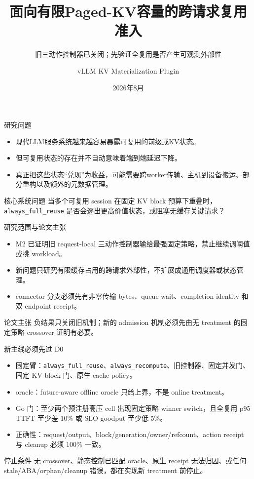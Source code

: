 \documentclass[aspectratio=169,UTF8,11pt]{ctexbeamer}
\title[有限缓存复用准入]{面向有限Paged-KV容量的跨请求复用准入}
\subtitle{旧三动作控制器已关闭；先验证全复用是否产生可观测外部性}
\author[KV Materialization]{vLLM KV Materialization Plugin}
\date[2026年8月]{2026年8月}
\begin{document}
\begin{frame}[plain]
  \titlepage
\end{frame}

\begin{frame}{研究问题}
  \begin{itemize}
    \item 现代LLM服务系统越来越容易暴露可复用的前缀或KV状态。
    \item 但\alert{可复用状态的存在}并不自动意味着\alert{端到端延迟下降}。
    \item 真正把这些状态“兑现”为收益，可能需要跨worker传输、主机到设备搬运、部分重构以及额外的元数据管理。
  \end{itemize}

  \vspace{0.5em}
  \begin{block}{核心系统问题}
    当多个可复用 session 在固定 KV block 预算下重叠时，
    \texttt{always\_full\_reuse} 是否会逐出更高价值状态，或阻塞无缓存关键请求？
  \end{block}
\end{frame}

\begin{frame}{研究范围与论文主张}
  \begin{itemize}
    \item M2 已证明旧 request-local 三动作控制器输给最强固定策略，禁止继续调阈值或挑 workload。
    \item 新问题只研究\alert{有限缓存占用的跨请求外部性}，不扩展成通用调度器或状态管理。
    \item connector 分支必须先有非零传输 bytes、queue wait、completion identity 和双 endpoint receipt。
  \end{itemize}

  \vspace{0.5em}
  \begin{block}{论文主张}
    负结果只关闭旧机制；新的 admission 机制必须先由无 treatment 的固定策略 crossover 证明有必要。
  \end{block}
\end{frame}

\begin{frame}{新主线必须先过 D0}
  \begin{itemize}
    \item 固定臂：\texttt{always\_full\_reuse}、\texttt{always\_recompute}、旧控制器、固定并发门、固定 KV block 门、原生 cache policy。
    \item oracle：future-aware offline oracle 只给上界，不是 online treatment。
    \item Go 门：至少两个预注册高压 cell 出现固定策略 winner switch，且全复用 p95 TTFT 至少差 10\% 或 SLO goodput 至少低 5\%。
    \item 正确性：request/output、block/generation/owner/refcount、action receipt 与 cleanup 必须 100\% 一致。
  \end{itemize}

  \begin{block}{停止条件}
    无 crossover、静态控制已匹配 oracle、原生 receipt 无法归因、或任何 stale/ABA/orphan/cleanup 错误，都在实现新 treatment 前停止。
  \end{block}
\end{frame}
\end{document}
